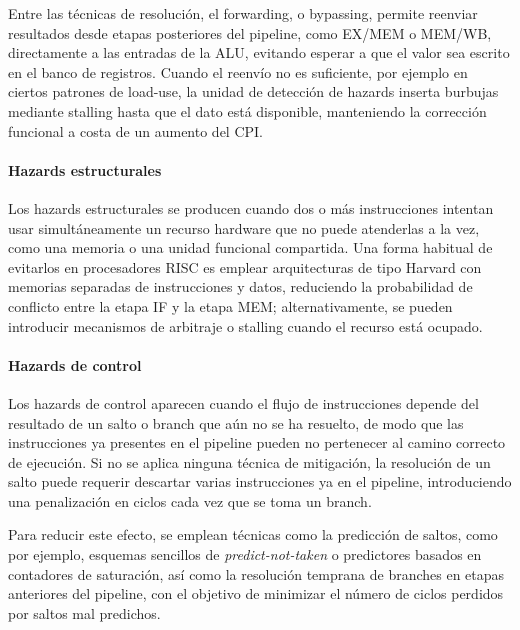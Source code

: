 Entre las técnicas de resolución, el forwarding, o bypassing, permite reenviar resultados desde etapas posteriores del pipeline, como EX/MEM o MEM/WB, directamente a las entradas de la ALU, evitando esperar a que el valor sea escrito en el banco de registros. Cuando el reenvío no es suficiente, por ejemplo en ciertos patrones de load-use, la unidad de detección de hazards inserta burbujas mediante stalling hasta que el dato está disponible, manteniendo la corrección funcional a costa de un aumento del CPI.\parencite{Najjar2018Pipeline}


\paragraph{Hazards estructurales}

Los hazards estructurales se producen cuando dos o más instrucciones intentan usar simultáneamente un recurso hardware que no puede atenderlas a la vez, como una memoria o una unidad funcional compartida. Una forma habitual de evitarlos en procesadores RISC es emplear arquitecturas de tipo Harvard con memorias separadas de instrucciones y datos, reduciendo la probabilidad de conflicto entre la etapa IF y la etapa MEM; alternativamente, se pueden introducir mecanismos de arbitraje o stalling cuando el recurso está ocupado.\parencite{Chu2011FPGA}


\paragraph{Hazards de control}

Los hazards de control aparecen cuando el flujo de instrucciones depende del resultado de un salto o branch que aún no se ha resuelto, de modo que las instrucciones ya presentes en el pipeline pueden no pertenecer al camino correcto de ejecución. Si no se aplica ninguna técnica de mitigación, la resolución de un salto puede requerir descartar varias instrucciones ya en el pipeline, introduciendo una penalización en ciclos cada vez que se toma un branch.\parencite{Patterson2017Computer,Harris2021Digital}

Para reducir este efecto, se emplean técnicas como la predicción de saltos, como por ejemplo, esquemas sencillos de \emph{predict-not-taken} o predictores basados en contadores de saturación, así como la resolución temprana de branches en etapas anteriores del pipeline, con el objetivo de minimizar el número de ciclos perdidos por saltos mal predichos.\parencite{Najjar2018Pipeline}

